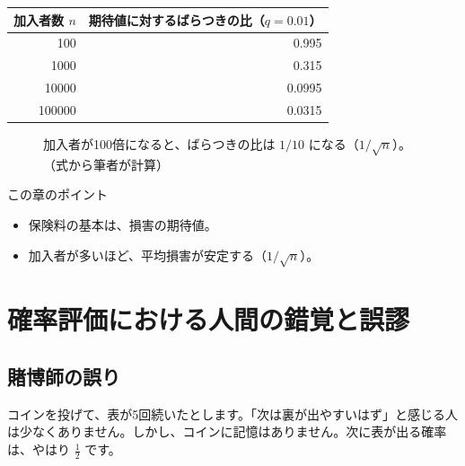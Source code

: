 \documentclass[a4paper,11pt,openany]{ltjsbook}
\begin{document}
\begin{center}
\begin{tabular}{rr}
\toprule
加入者数 $n$ & 期待値に対するばらつきの比（$q=0.01$）\\
\midrule
100 & 0.995\\
1000 & 0.315\\
10000 & 0.0995\\
100000 & 0.0315\\
\bottomrule
\end{tabular}
\end{center}

\begin{figure}[htbp]
\centering
{}
\caption{加入者が100倍になると、ばらつきの比は $1/10$ になる（$1/\sqrt n$）。（式から筆者が計算）}
\end{figure}

\begin{pointbox}{この章のポイント}
\begin{itemize}[leftmargin=1.5em]
\item 保険料の基本は、損害の期待値。
\item 加入者が多いほど、平均損害が安定する（$1/\sqrt n$）。
\end{itemize}
\end{pointbox}

\chapter{確率評価における人間の錯覚と誤謬}

\section{賭博師の誤り}

コインを投げて、表が5回続いたとします。「次は裏が出やすいはず」と感じる人は少なくありません。しかし、コインに記憶はありません。次に表が出る確率は、やはり $\frac12$ です。
\end{document}
